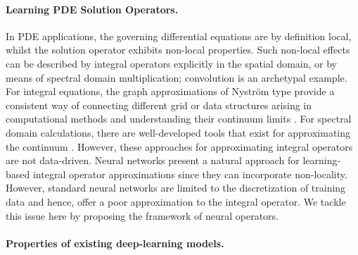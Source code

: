 \paragraph{Learning PDE Solution Operators.}
 In PDE applications, the governing differential equations are by definition local, whilst the solution operator exhibits non-local properties. Such non-local effects can be described by integral operators explicitly in the spatial domain, or by means of spectral domain multiplication; convolution is an archetypal example. For integral equations, the graph approximations of Nystr\"om type \citep{belongie2002spectral} provide a consistent way of connecting different grid or data structures arising in computational methods and understanding their continuum limits \citep{von2008consistency,trillos2018variational,trillos2020error}. For spectral domain calculations, there are well-developed tools that exist for approximating the continuum \citep{boyd2001chebyshev,trefethen2000spectral}. However, these approaches for approximating integral operators are not data-driven.  Neural networks present a natural approach for learning-based integral operator approximations since they can incorporate non-locality. However, standard neural networks are limited to the discretization of training data and hence, offer a poor approximation to the integral operator. We tackle this issue here by proposing the framework of neural operators. 
 
 



%


\paragraph{Properties of existing deep-learning models.} 

